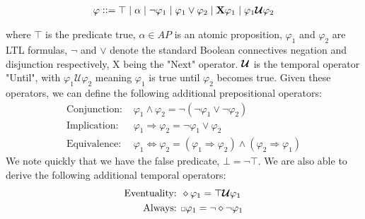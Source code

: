 \begin{align*}
    \varphi ::= \top \hspace{0.1cm} |\hspace{0.1cm} \alpha \hspace{0.1cm} | \hspace{0.1cm} \neg \varphi_1 \hspace{0.1cm} | \hspace{0.1cm} \varphi_1  \lor \varphi_2 \hspace{0.1cm} | \hspace{0.1cm} \textbf{X} \varphi_1 \hspace{0.1cm} | \hspace{0.1cm} \varphi_1 \bm{\mathcal{U}} \varphi_2
\end{align*}

where $\top$ is the predicate true, $\alpha \in AP$ is an atomic proposition, $\varphi_1$ and $\varphi_2$ are LTL formulas, $\neg$ and $\lor$ denote the standard Boolean connectives negation and disjunction respectively, X being the "Next" operator. $\bm{\mathcal{U}}$ is the temporal operator "Until", with $\varphi_1 \mathcal{U} \varphi_2$ meaning $\varphi_1$ is true until $\varphi_2$ becomes true. Given these operators, we can define the following additional prepositional operators:
\begin{align*}
    \text{Conjunction: }&  \varphi_1  \land \varphi_2 = \neg(\neg \varphi_1 \lor \neg \varphi_2) \\
    \text{Implication: }& \varphi_1 \Rightarrow \varphi_2 = \neg \varphi_1 \lor \varphi_2 \\
    \text{Equivalence: }& \varphi_1 \Leftrightarrow \varphi_2 = (\varphi_1 \Rightarrow \varphi_2) \land (\varphi_2 \Rightarrow \varphi_1)
\end{align*}
We note quickly that we have the false predicate, $\bot = \neg \top$.
We are also able to derive the following additional temporal operators:
\begin{align*}
    \text{Eventuality: }& \diamond \varphi_1 = \top \U \varphi_1 \\
    \text{Always: }& \ssquare \varphi_1 = \neg \diamond \neg \varphi_1
\end{align*}

